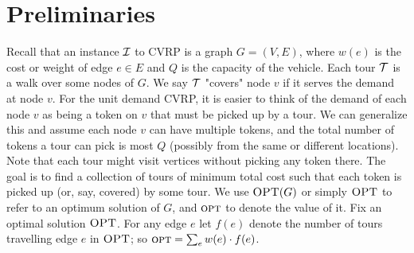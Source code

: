 \documentclass[twoside,leqno]{article}
\newcommand{\calI}{{\cal I}}
\newcommand{\calT}{{\cal T}}
\newcommand{\opt}{\mbox{\sc opt}}
\newcommand{\OPT}{\mbox{\sc OPT}}
\begin{document}
\section{Preliminaries}
Recall that an instance $\calI$ to CVRP is a graph $G = (V,E)$, where $w(e)$ is the cost or weight of edge $e \in E$ and $Q$ is the capacity of the vehicle. Each tour $\calT$ is a walk over some nodes of $G$. We say $\cal T$ "covers" node $v$ if it serves the demand at node $v$. For the unit demand CVRP, it is easier to think of the demand of each node $v$ as being a token on $v$ that must be picked up by a tour. We can generalize this and assume each node $v$ can have multiple tokens, and the total number of tokens a tour can pick is most $Q$ (possibly
from the same or different locations). Note that each tour might visit vertices without picking any token there.
The goal is to find a collection of tours of minimum total cost such that each token is picked up (or, say, covered) by some tour.
We use $\OPT(G)$ or simply $\OPT$ to refer to an optimum solution of $G$, and $\opt$ to denote the value of it. Fix an optimal solution $\OPT$. For any edge $e$ let $f(e)$ denote the number of tours travelling edge $e$ in $\OPT$;
so $\opt=\sum_e w(e)\cdot f(e)$.
\end{document}
